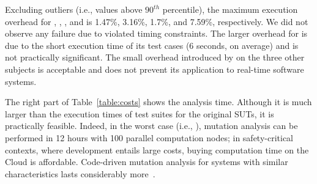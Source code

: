 
{
Excluding outliers (i.e., values above $90^{th}$ percentile), the maximum execution overhead for 
\ADCS, \GPS, \PDHU, and \PARAM is 1.47\%, 3.16\%, 1.7\%, and 7.59\%, respectively.
We did not observe any failure due to violated timing constraints. 
The larger overhead for \PARAM is due to the short execution time of its test cases (6 seconds, on average) and is not practically significant.
The small overhead introduced by \APPR on the three other subjects is acceptable and does not prevent its application to real-time software systems.}


The right part of Table~\ref{table:costs} shows the \APPR analysis time. Although it is much larger than the execution times of test suites for the original SUTs, it is practically feasible. Indeed, in the worst case (i.e., \ADCS), mutation analysis can be performed in 12 hours with 100 parallel computation nodes; in safety-critical contexts, where development entails large costs, buying computation time on the Cloud is affordable. {Code-driven mutation analysis for systems with similar characteristics lasts considerably more~\cite{Ramler2017,Oscar:MASS:TSE}.}


